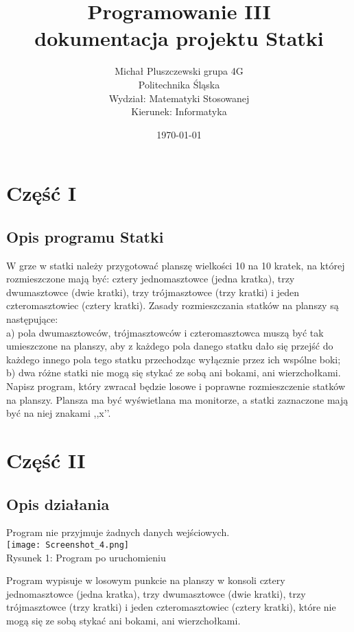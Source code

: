 \documentclass[12pt,a4paper]{article}
\begin{document}
	
	\title{Programowanie III\\{dokumentacja projektu Statki}}
	\author{Michał Pluszczewski grupa 4G\\Politechnika Śląska \\ Wydział: Matematyki Stosowanej\\ Kierunek: Informatyka}

	\date{\today}

	\maketitle
	\newpage
	\section*{Część I}
	\subsection*{Opis programu Statki}
	W grze w statki należy przygotować planszę wielkości 10 na 10 kratek, na której
rozmieszczone mają być: cztery jednomasztowce (jedna kratka), trzy dwumasztowce
(dwie kratki), trzy trójmasztowce (trzy kratki) i jeden czteromasztowiec (cztery kratki).
Zasady rozmieszczania statków na planszy są następujące:\\
a) pola dwumasztowców, trójmasztowców i czteromasztowca muszą być tak
umieszczone na planszy, aby z każdego pola danego statku dało się przejść do
każdego innego pola tego statku przechodząc wyłącznie przez ich wspólne
boki;\\
b) dwa różne statki nie mogą się stykać ze sobą ani bokami, ani wierzchołkami.
Napisz program, który zwracał będzie losowe i poprawne rozmieszczenie statków
na planszy. Plansza ma być wyświetlana ma monitorze, a statki zaznaczone mają być
na niej znakami ,,x’’.
	\section*{Część II}
	\subsection*{Opis działania}
	\begin{center}
	Program nie przyjmuje żadnych danych wejściowych.\\
    \texttt{[image: Screenshot\_4.png]}\\
    Rysunek 1: Program po uruchomieniu
    \end{center}
    Program wypisuje w losowym punkcie na planszy w konsoli cztery jednomasztowce (jedna kratka), trzy dwumasztowce (dwie kratki), trzy
trójmasztowce (trzy kratki) i jeden czteromasztowiec (cztery kratki), które nie mogą się ze sobą stykać ani bokami, ani wierzchołkami. 
    \newpage
\end{document}
